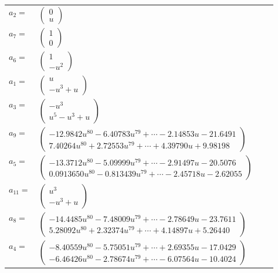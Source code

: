 \documentclass[1p]{elsarticle_modified}
\theoremstyle{definition}
\begin{document}
\begin{tabular}{m{7pt} m{180pt} m{7pt} m{180pt} }
\flushright $a_{2}=$&$\begin{pmatrix}0\\u\end{pmatrix}$ \\
\flushright $a_{7}=$&$\begin{pmatrix}1\\0\end{pmatrix}$ \\
\flushright $a_{6}=$&$\begin{pmatrix}1\\- u^2\end{pmatrix}$ \\
\flushright $a_{1}=$&$\begin{pmatrix}u\\- u^3+u\end{pmatrix}$ \\
\flushright $a_{3}=$&$\begin{pmatrix}- u^3\\u^5- u^3+u\end{pmatrix}$ \\
\flushright $a_{9}=$&$\begin{pmatrix}-12.9842 u^{80}-6.40783 u^{79}+\cdots-2.14853 u-21.6491\\7.40264 u^{80}+2.72553 u^{79}+\cdots+4.39790 u+9.98198\end{pmatrix}$ \\
\flushright $a_{5}=$&$\begin{pmatrix}-13.3712 u^{80}-5.09999 u^{79}+\cdots-2.91497 u-20.5076\\0.0913650 u^{80}-0.813439 u^{79}+\cdots-2.45718 u-2.62055\end{pmatrix}$ \\
\flushright $a_{11}=$&$\begin{pmatrix}u^3\\- u^3+u\end{pmatrix}$ \\
\flushright $a_{8}=$&$\begin{pmatrix}-14.4485 u^{80}-7.48009 u^{79}+\cdots-2.78649 u-23.7611\\5.28092 u^{80}+2.32374 u^{79}+\cdots+4.14897 u+5.26440\end{pmatrix}$ \\
\flushright $a_{4}=$&$\begin{pmatrix}-8.40559 u^{80}-5.75051 u^{79}+\cdots+2.69355 u-17.0429\\-6.46426 u^{80}-2.78674 u^{79}+\cdots-6.07564 u-10.4024\end{pmatrix}$ \\

\end{tabular}
\end{document}
